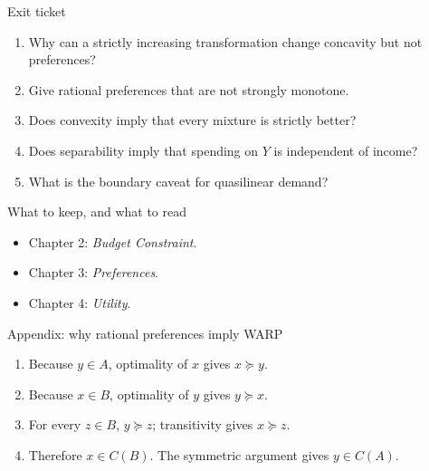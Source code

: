 \documentclass[handout,aspectratio=169,10pt]{beamer}
\begin{document}
\begin{frame}[label=exit-ticket]{Exit ticket}
\begin{enumerate}
\item Why can a strictly increasing transformation change concavity but not preferences?
\item Give rational preferences that are not strongly monotone.
\item Does convexity imply that every mixture is strictly better?
\item Does separability imply that spending on $Y$ is independent of income?
\item What is the boundary caveat for quasilinear demand?
\end{enumerate}

\end{frame}

\begin{frame}[label=reading]{What to keep, and what to read}

\begin{itemize}[<+(1)->]
\item Chapter 2: \emph{Budget Constraint}.
\item Chapter 3: \emph{Preferences}.
\item Chapter 4: \emph{Utility}.
\end{itemize}
\end{frame}

\appendix

\begin{frame}[label=proof-warp]{Appendix: why rational preferences imply WARP}

\begin{enumerate}
\item Because $y\in A$, optimality of $x$ gives $x\succeq y$.
\item Because $x\in B$, optimality of $y$ gives $y\succeq x$.
\item For every $z\in B$, $y\succeq z$; transitivity gives $x\succeq z$.
\item Therefore $x\in C(B)$. The symmetric argument gives $y\in C(A)$.
\end{enumerate}

\vfill{}
\end{frame}
\end{document}
